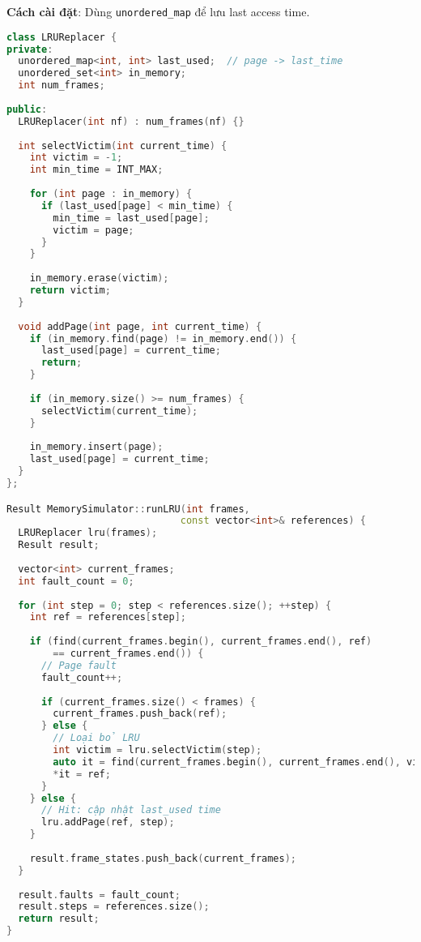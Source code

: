 \textbf{Cách cài đặt}: Dùng \texttt{unordered\_map} để lưu last access time.

\begin{lstlisting}[language=C++,caption={LRU Page Replacement}]
class LRUReplacer {
private:
  unordered_map<int, int> last_used;  // page -> last_time
  unordered_set<int> in_memory;
  int num_frames;
  
public:
  LRUReplacer(int nf) : num_frames(nf) {}
  
  int selectVictim(int current_time) {
    int victim = -1;
    int min_time = INT_MAX;
    
    for (int page : in_memory) {
      if (last_used[page] < min_time) {
        min_time = last_used[page];
        victim = page;
      }
    }
    
    in_memory.erase(victim);
    return victim;
  }
  
  void addPage(int page, int current_time) {
    if (in_memory.find(page) != in_memory.end()) {
      last_used[page] = current_time;
      return;
    }
    
    if (in_memory.size() >= num_frames) {
      selectVictim(current_time);
    }
    
    in_memory.insert(page);
    last_used[page] = current_time;
  }
};

Result MemorySimulator::runLRU(int frames, 
                              const vector<int>& references) {
  LRUReplacer lru(frames);
  Result result;
  
  vector<int> current_frames;
  int fault_count = 0;
  
  for (int step = 0; step < references.size(); ++step) {
    int ref = references[step];
    
    if (find(current_frames.begin(), current_frames.end(), ref) 
        == current_frames.end()) {
      // Page fault
      fault_count++;
      
      if (current_frames.size() < frames) {
        current_frames.push_back(ref);
      } else {
        // Loại bỏ LRU
        int victim = lru.selectVictim(step);
        auto it = find(current_frames.begin(), current_frames.end(), victim);
        *it = ref;
      }
    } else {
      // Hit: cập nhật last_used time
      lru.addPage(ref, step);
    }
    
    result.frame_states.push_back(current_frames);
  }
  
  result.faults = fault_count;
  result.steps = references.size();
  return result;
}
\end{lstlisting}

